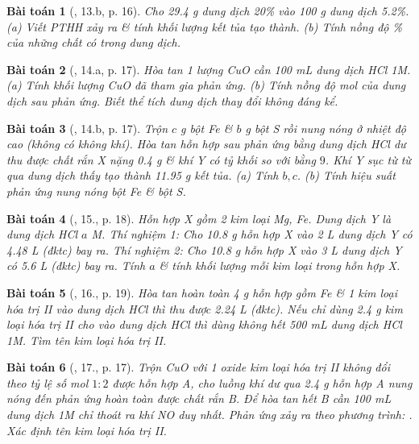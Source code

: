 \documentclass{article}
\newtheorem{baitoan}{Bài toán}
\begin{document}
\begin{baitoan}[\cite{An_350_BT_Hoa_Hoc_9}, 13.b, p. 16]
	Cho \emph{29.4 g} dung dịch \emph{ 20\%} vào \emph{100 g} dung dịch \emph{ 5.2\%}. (a) Viết PTHH xảy ra \& tính khối lượng kết tủa tạo thành. (b) Tính nồng độ \% của những chất có trong dung dịch.
\end{baitoan}

\begin{baitoan}[\cite{An_350_BT_Hoa_Hoc_9}, 14.a, p. 17]
	Hòa tan 1 lượng \emph{CuO} cần \emph{100 mL} dung dịch \emph{HCl 1M}. (a) Tính khối lượng \emph{CuO} đã tham gia phản ứng. (b) Tính nồng độ mol của dung dịch sau phản ứng. Biết thể tích dung dịch thay đổi không đáng kể.
\end{baitoan}

\begin{baitoan}[\cite{An_350_BT_Hoa_Hoc_9}, 14.b, p. 17]
	Trộn $c$ \emph{g} bột \emph{Fe} \& $b$ \emph{g} bột \emph{S} rồi nung nóng ở nhiệt độ cao (không có không khí). Hòa tan hỗn hợp sau phản ứng bằng dung dịch \emph{HCl} dư thu được chất rắn X nặng \emph{0.4 g} \& khí Y có tỷ khối so với \emph{} bằng $9$. Khí Y sục từ từ qua dung dịch \emph{} thấy tạo thành \emph{11.95 g} kết tủa. (a) Tính $b,c$. (b) Tính hiệu suất phản ứng nung nóng bột \emph{Fe} \& bột \emph{S}.
\end{baitoan}

\begin{baitoan}[\cite{An_350_BT_Hoa_Hoc_9}, 15., p. 18]
	Hỗn hợp X gồm 2 kim loại \emph{Mg, Fe}. Dung dịch Y là dung dịch \emph{HCl $a$ M}. Thí nghiệm 1: Cho \emph{10.8 g} hỗn hợp X vào \emph{2 L} dung dịch Y có \emph{4.48 L } (đktc) bay ra. Thí nghiệm 2: Cho \emph{10.8 g} hỗn hợp X vào \emph{3 L} dung dịch Y có \emph{5.6 L } (đktc) bay ra. Tính $a$ \& tính khối lượng mỗi kim loại trong hỗn hợp X.
\end{baitoan}

\begin{baitoan}[\cite{An_350_BT_Hoa_Hoc_9}, 16., p. 19]
	Hòa tan hoàn toàn \emph{4 g} hỗn hợp gồm \emph{Fe} \& 1 kim loại hóa trị II vào dung dịch \emph{HCl} thì thu được \emph{2.24 L } (đktc). Nếu chỉ dùng \emph{2.4 g} kim loại hóa trị II cho vào dung dịch \emph{HCl} thì dùng không hết \emph{500 mL} dung dịch \emph{HCl 1M}. Tìm tên kim loại hóa trị II.
\end{baitoan}

\begin{baitoan}[\cite{An_350_BT_Hoa_Hoc_9}, 17., p. 17]
	Trộn \emph{CuO} với 1 oxide kim loại hóa trị II không đổi theo tỷ lệ số mol $1:2$ được hỗn hợp A, cho luồng khí \emph{} dư qua \emph{2.4 g} hỗn hợp A nung nóng đến phản ứng hoàn toàn được chất rắn B. Để hòa tan hết B cần \emph{100 mL} dung dịch \emph{ 1M} chỉ thoát ra khí \emph{NO} duy nhất. Phản ứng xảy ra theo phương trình: \emph{}. Xác định tên kim loại hóa trị II.
\end{baitoan}
\end{document}
